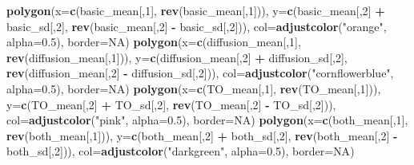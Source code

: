\documentclass[]{book}
\newenvironment{Shaded}{\begin{snugshade}}{\end{snugshade}}
\newcommand{\KeywordTok}[1]{\textcolor[rgb]{0.13,0.29,0.53}{\textbf{{#1}}}}
\newcommand{\DataTypeTok}[1]{\textcolor[rgb]{0.13,0.29,0.53}{{#1}}}
\newcommand{\DecValTok}[1]{\textcolor[rgb]{0.00,0.00,0.81}{{#1}}}
\newcommand{\FloatTok}[1]{\textcolor[rgb]{0.00,0.00,0.81}{{#1}}}
\newcommand{\StringTok}[1]{\textcolor[rgb]{0.31,0.60,0.02}{{#1}}}
\newcommand{\OtherTok}[1]{\textcolor[rgb]{0.56,0.35,0.01}{{#1}}}
\newcommand{\OperatorTok}[1]{\textcolor[rgb]{0.81,0.36,0.00}{\textbf{{#1}}}}
\newcommand{\NormalTok}[1]{{#1}}
\theoremstyle{definition}
\theoremstyle{definition}
\theoremstyle{definition}
\theoremstyle{remark}
\begin{document}
\begin{Shaded}
\begin{Highlighting}[]
\KeywordTok{polygon}\NormalTok{(}\DataTypeTok{x=}\KeywordTok{c}\NormalTok{(basic_mean[,}\DecValTok{1}\NormalTok{], }\KeywordTok{rev}\NormalTok{(basic_mean[,}\DecValTok{1}\NormalTok{])), }\DataTypeTok{y=}\KeywordTok{c}\NormalTok{(basic_mean[,}\DecValTok{2}\NormalTok{] }\OperatorTok{+}\StringTok{ }\NormalTok{basic_sd[,}\DecValTok{2}\NormalTok{], }\KeywordTok{rev}\NormalTok{(basic_mean[,}\DecValTok{2}\NormalTok{] }\OperatorTok{-}\StringTok{ }\NormalTok{basic_sd[,}\DecValTok{2}\NormalTok{])), }\DataTypeTok{col=}\KeywordTok{adjustcolor}\NormalTok{(}\StringTok{"orange"}\NormalTok{, }\DataTypeTok{alpha=}\FloatTok{0.5}\NormalTok{), }\DataTypeTok{border=}\OtherTok{NA}\NormalTok{)}
\KeywordTok{polygon}\NormalTok{(}\DataTypeTok{x=}\KeywordTok{c}\NormalTok{(diffusion_mean[,}\DecValTok{1}\NormalTok{], }\KeywordTok{rev}\NormalTok{(diffusion_mean[,}\DecValTok{1}\NormalTok{])), }\DataTypeTok{y=}\KeywordTok{c}\NormalTok{(diffusion_mean[,}\DecValTok{2}\NormalTok{] }\OperatorTok{+}\StringTok{ }\NormalTok{diffusion_sd[,}\DecValTok{2}\NormalTok{], }\KeywordTok{rev}\NormalTok{(diffusion_mean[,}\DecValTok{2}\NormalTok{] }\OperatorTok{-}\StringTok{ }\NormalTok{diffusion_sd[,}\DecValTok{2}\NormalTok{])), }\DataTypeTok{col=}\KeywordTok{adjustcolor}\NormalTok{(}\StringTok{"cornflowerblue"}\NormalTok{, }\DataTypeTok{alpha=}\FloatTok{0.5}\NormalTok{), }\DataTypeTok{border=}\OtherTok{NA}\NormalTok{)}
\KeywordTok{polygon}\NormalTok{(}\DataTypeTok{x=}\KeywordTok{c}\NormalTok{(TO_mean[,}\DecValTok{1}\NormalTok{], }\KeywordTok{rev}\NormalTok{(TO_mean[,}\DecValTok{1}\NormalTok{])), }\DataTypeTok{y=}\KeywordTok{c}\NormalTok{(TO_mean[,}\DecValTok{2}\NormalTok{] }\OperatorTok{+}\StringTok{ }\NormalTok{TO_sd[,}\DecValTok{2}\NormalTok{], }\KeywordTok{rev}\NormalTok{(TO_mean[,}\DecValTok{2}\NormalTok{] }\OperatorTok{-}\StringTok{ }\NormalTok{TO_sd[,}\DecValTok{2}\NormalTok{])), }\DataTypeTok{col=}\KeywordTok{adjustcolor}\NormalTok{(}\StringTok{"pink"}\NormalTok{, }\DataTypeTok{alpha=}\FloatTok{0.5}\NormalTok{), }\DataTypeTok{border=}\OtherTok{NA}\NormalTok{)}
\KeywordTok{polygon}\NormalTok{(}\DataTypeTok{x=}\KeywordTok{c}\NormalTok{(both_mean[,}\DecValTok{1}\NormalTok{], }\KeywordTok{rev}\NormalTok{(both_mean[,}\DecValTok{1}\NormalTok{])), }\DataTypeTok{y=}\KeywordTok{c}\NormalTok{(both_mean[,}\DecValTok{2}\NormalTok{] }\OperatorTok{+}\StringTok{ }\NormalTok{both_sd[,}\DecValTok{2}\NormalTok{], }\KeywordTok{rev}\NormalTok{(both_mean[,}\DecValTok{2}\NormalTok{] }\OperatorTok{-}\StringTok{ }\NormalTok{both_sd[,}\DecValTok{2}\NormalTok{])), }\DataTypeTok{col=}\KeywordTok{adjustcolor}\NormalTok{(}\StringTok{"darkgreen"}\NormalTok{, }\DataTypeTok{alpha=}\FloatTok{0.5}\NormalTok{), }\DataTypeTok{border=}\OtherTok{NA}\NormalTok{)}




\end{Highlighting}
\end{Shaded}
\end{document}
